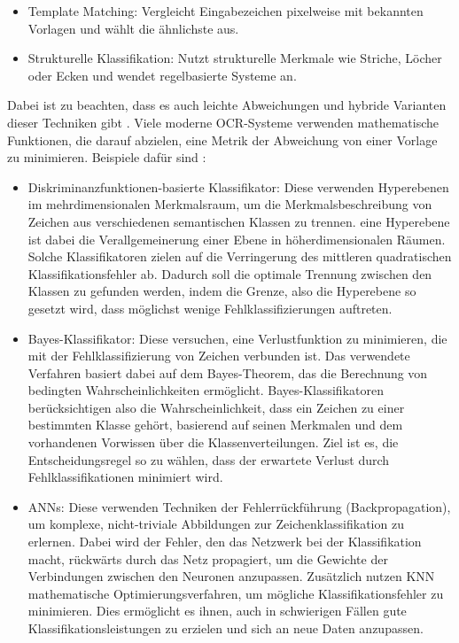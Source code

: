 \begin{itemize}
	\item Template Matching: Vergleicht Eingabezeichen pixelweise mit bekannten Vorlagen und wählt die ähnlichste aus.
	\item Strukturelle Klassifikation: Nutzt strukturelle Merkmale wie Striche, Löcher oder Ecken und wendet regelbasierte Systeme an.
\end{itemize}

Dabei ist zu beachten, dass es auch leichte Abweichungen und hybride Varianten dieser Techniken gibt \parencite{BorovikovEugene2014Asom}. Viele moderne \gls{OCR}-Systeme verwenden mathematische Funktionen, die darauf abzielen, eine Metrik der Abweichung von einer Vorlage zu minimieren. Beispiele dafür sind \parencite{BorovikovEugene2014Asom}:

\begin{itemize}
	\item Diskriminanzfunktionen-basierte Klassifikator: Diese verwenden Hyperebenen im mehrdimensionalen Merkmalsraum, um die
	Merkmalsbeschreibung von Zeichen aus verschiedenen semantischen Klassen zu trennen. eine Hyperebene ist dabei die Verallgemeinerung einer Ebene in höherdimensionalen Räumen. Solche Klassifikatoren zielen auf die Verringerung des	mittleren quadratischen Klassifikationsfehler ab. Dadurch soll die optimale Trennung zwischen den Klassen zu gefunden werden, indem die Grenze, also die Hyperebene so gesetzt wird, dass möglichst wenige Fehlklassifizierungen auftreten.
	\item Bayes-Klassifikator: Diese versuchen, eine Verlustfunktion zu minimieren, die mit der Fehlklassifizierung von Zeichen verbunden ist. Das verwendete Verfahren basiert dabei auf dem Bayes-Theorem, das die Berechnung von bedingten Wahrscheinlichkeiten ermöglicht. Bayes-Klassifikatoren berücksichtigen also die Wahrscheinlichkeit, dass ein Zeichen zu einer bestimmten Klasse gehört, basierend auf seinen Merkmalen und dem vorhandenen Vorwissen über die Klassenverteilungen. Ziel ist es, die Entscheidungsregel so zu wählen, dass der erwartete Verlust durch Fehlklassifikationen minimiert wird.
	\item \glspl{ANN}: Diese verwenden Techniken der Fehlerrückführung (Backpropagation), um komplexe, nicht-triviale Abbildungen zur Zeichenklassifikation zu erlernen. Dabei wird der Fehler, den das Netzwerk bei der Klassifikation macht, rückwärts durch das Netz propagiert, um die Gewichte der Verbindungen zwischen den Neuronen anzupassen. Zusätzlich nutzen KNN mathematische Optimierungsverfahren, um mögliche Klassifikationsfehler zu minimieren. Dies ermöglicht es ihnen, auch in schwierigen Fällen gute Klassifikationsleistungen zu erzielen und sich an neue Daten anzupassen.
\end{itemize}

